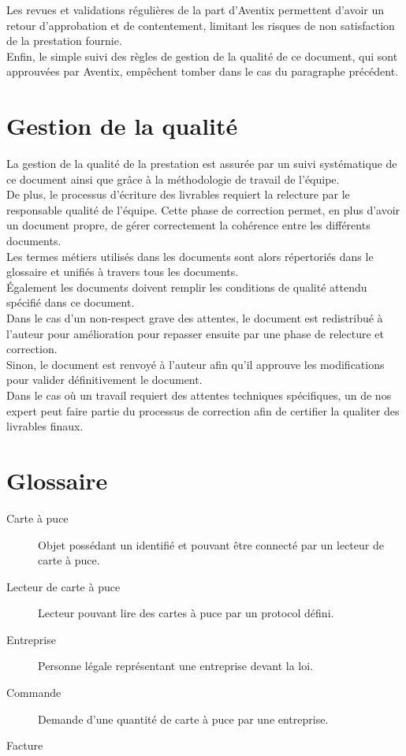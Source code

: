 Les revues et validations régulières de la part d'Aventix permettent d'avoir un
retour d'approbation et de contentement, limitant les risques de non
satisfaction de la prestation fournie. \\

Enfin, le simple suivi des règles de gestion de la qualité de ce document, qui
sont approuvées par Aventix, empêchent tomber dans le cas du paragraphe
précédent. \\

\section{Gestion de la qualité}
La gestion de la qualité de la prestation est assurée par un suivi systématique
de ce document ainsi que grâce à la méthodologie de travail de l'équipe. \\

De plus, le processus d'écriture des livrables requiert la relecture par le
responsable qualité de l'équipe. Cette phase de correction permet, en plus
d'avoir un document propre, de gérer correctement la cohérence entre les
différents documents. \\

Les termes métiers utilisés dans les documents sont alors répertoriés dans le
glossaire et unifiés à travers tous les documents. \\
Également les documents doivent remplir les conditions de qualité attendu
spécifié dans ce document. \\

Dans le cas d'un non-respect grave des attentes, le document est redistribué à
l'auteur pour amélioration pour repasser ensuite par une phase de relecture et
correction. \\
Sinon, le document est renvoyé à l'auteur afin qu'il approuve les modifications
pour valider définitivement le document. \\

Dans le cas où un travail requiert des attentes techniques spécifiques, un de
nos expert peut faire partie du processus de correction afin de certifier la
qualiter des livrables finaux. \\

\section{Glossaire}

\begin{description}
  \item[Carte à puce] Objet possédant un identifié et pouvant être connecté par un lecteur de carte à puce.
  \item[Lecteur de carte à puce] Lecteur pouvant lire des cartes à puce par un protocol défini.
  \item[Entreprise] Personne légale représentant une entreprise devant la loi.
  \item[Commande] Demande d'une quantité de carte à puce par une entreprise.
  \item[Facture]
\end{description}




